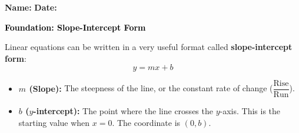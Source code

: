 \documentclass[12pt, letterpaper, fleqn]{article}
\begin{document}
\textbf{Name:} \underline{\hspace{5cm}}
\hfill
\textbf{Date:} \underline{\hspace{3cm}}\\

\begin{tcolorbox}[colback=customteal!20]
    \large\textcolor{black}{\textbf{Foundation: Slope-Intercept Form}}
\end{tcolorbox}

\vspace{3mm}

\noindent
Linear equations can be written in a very useful format called \textbf{slope-intercept form}:
\[ y = mx + b \]

\begin{itemize}
    \item \textbf{$m$ (Slope):} The steepness of the line, or the constant rate of change ($\dfrac{\text{Rise}}{\text{Run}}$).
    \item \textbf{$b$ ($y$-intercept):} The point where the line crosses the $y$-axis. This is the starting value when $x = 0$. The coordinate is $(0, b)$.
\end{itemize}

\vspace{4mm}
\end{document}
